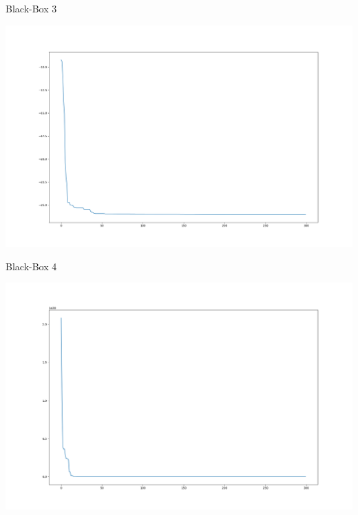 \documentclass{ocbeameruni}
\begin{document}
\begin{frame}{Black-Box 3}
    \begin{center}
    \includegraphics[scale=0.25]{plots/bb3_2.png}
    \end{center}
\end{frame}

\begin{frame}{Black-Box 4}
    \begin{center}
    \includegraphics[scale=0.25]{plots/bb4_2.png}
    \end{center}
\end{frame}
\end{document}
